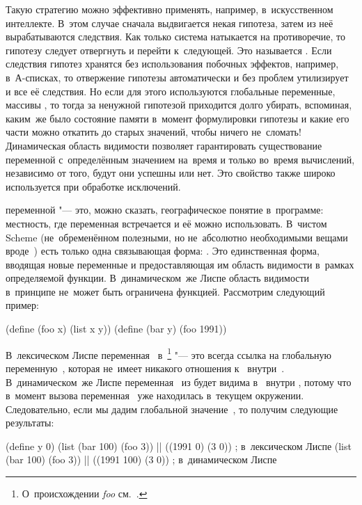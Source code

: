 Такую стратегию можно эффективно применять, например, в~искусственном
интеллекте. В~этом случае сначала выдвигается некая гипотеза, затем из неё
вырабатываются следствия. Как только система натыкается на противоречие, то
гипотезу следует отвергнуть и перейти к~следующей. Это называется . Если следствия гипотез хранятся без использования побочных
эффектов, например, в~А-списках, то отвержение гипотезы автоматически и без
проблем утилизирует и все её следствия. Но если для этого используются
глобальные переменные, массивы {\itd}, то тогда за ненужной гипотезой
приходится долго убирать, вспоминая, каким~же было состояние памяти в~момент
формулировки гипотезы и какие его части можно откатить до старых значений, чтобы
ничего не~сломать! Динамическая область видимости позволяет гарантировать
существование переменной с~определённым значением на~время и только во~время
вычислений, независимо от того, будут они успешны или нет. Это свойство также
широко используется при обработке исключений.

 переменной "--- это, можно сказать, географическое
понятие в~программе: местность, где переменная встречается и её можно
использовать. В~чистом Scheme (не~обременённом полезными, но не~абсолютно
необходимыми вещами вроде~) есть только одна связывающая форма:
. Это единственная форма, вводящая новые переменные и предоставляющая
им область видимости в~рамках определяемой функции. В~динамическом~же Лиспе
область видимости в~принципе не~может быть ограничена функцией. Рассмотрим
следующий пример:

\begin{code:lisp}
(define (foo x) (list x y))
(define (bar y) (foo 1991))
\end{code:lisp}

В~лексическом Лиспе переменная~ в~\footnote{О~происхождении
\emph{foo} см.~\cite{ray91}.} "--- это всегда ссылка на глобальную
переменную~, которая не~имеет никакого отношения к~ внутри~.
В~динамическом~же Лиспе переменная~ из  будет видима в~
внутри , потому что в~момент вызова  переменная~ уже
находилась в~текущем окружении. Следовательно, если мы дадим глобальной 
значение~, то получим следующие результаты:

\begin{code:lisp}
(define y 0)
(list (bar 100) (foo 3)) |\is| ((1991 0) (3 0))   ; в~лексическом Лиспе
(list (bar 100) (foo 3)) |\is| ((1991 100) (3 0)) ; в~динамическом Лиспе
\end{code:lisp}

